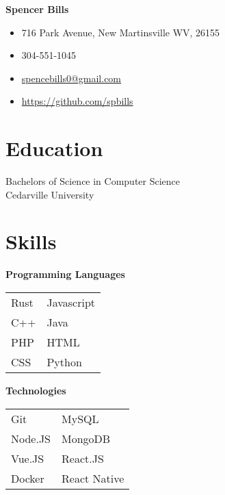 \documentclass[10pt]{article}
\begin{document}
    \begin{paracol}{2}
        \parbox[top][0.08\textheight][c]{\linewidth}{
            \textbf{\Huge{Spencer Bills}}
        }
        
        \switchcolumn
        
        \parbox[top][0.08\textheight][c]{\linewidth}{
                \begin{itemize}[noitemsep]
                    \item[] 716 Park Avenue, New Martinsville WV, 26155
                    \item[] 304-551-1045
                    \item[] \href{mailto://spencebills0@gmail.com}{spencebills0@gmail.com}
                    \item[] \url{https://github.com/spbills}
                \end{itemize}
        }
        
        \switchcolumn

        \section*{Education}
        \parbox[top][][c]{\linewidth}{
            Bachelors of Science in Computer Science \\
            Cedarville University 
        }
        
        \section*{Skills}

        \parbox[top][][c]{\linewidth}{
            \begin{center}
                \textbf{Programming Languages}
            \end{center}
            \begin{tabularx}{\linewidth}{YY}
                Rust & Javascript \\
                C++ & Java \\
                PHP & HTML \\
                CSS & Python \\
            \end{tabularx}
            
            \begin{center}
                \textbf{Technologies}
            \end{center}
            \begin{tabularx}{\linewidth}{YY}
                Git & MySQL \\
                Node.JS & MongoDB \\
                Vue.JS & React.JS \\
                Docker & React Native 
            \end{tabularx}
        }


\end{paracol}
\end{document}
